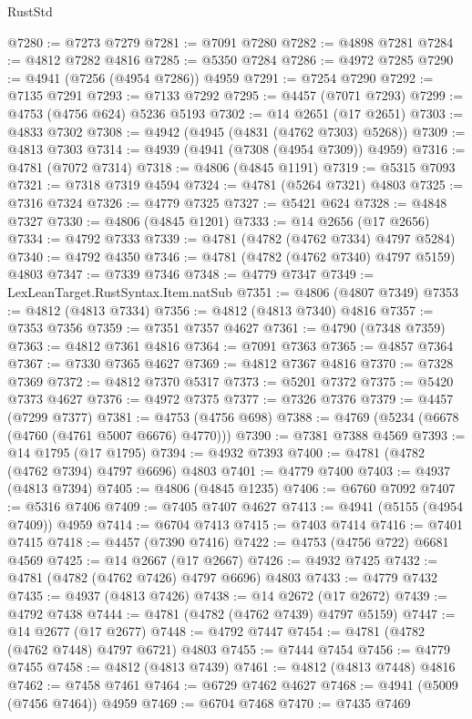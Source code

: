 \begin{lexlean}{RustStd}
\begin{coremodule}
@7280 := @7273 @7279
@7281 := @7091 @7280
@7282 := @4898 @7281
@7284 := @4812 @7282 @4816
@7285 := @5350 @7284
@7286 := @4972 @7285
@7290 := @4941 (@7256 (@4954 @7286)) @4959
@7291 := @7254 @7290
@7292 := @7135 @7291
@7293 := @7133 @7292
@7295 := @4457 (@7071 @7293)
@7299 := @4753 (@4756 @624) @5236 @5193
@7302 := @14 @2651 (@17 @2651)
@7303 := @4833 @7302
@7308 := @4942 (@4945 (@4831 (@4762 @7303) @5268))
@7309 := @4813 @7303
@7314 := @4939 (@4941 (@7308 (@4954 @7309)) @4959)
@7316 := @4781 (@7072 @7314)
@7318 := @4806 (@4845 @1191)
@7319 := @5315 @7093
@7321 := @7318 @7319 @4594
@7324 := @4781 (@5264 @7321) @4803
@7325 := @7316 @7324
@7326 := @4779 @7325
@7327 := @5421 @624
@7328 := @4848 @7327
@7330 := @4806 (@4845 @1201)
@7333 := @14 @2656 (@17 @2656)
@7334 := @4792 @7333
@7339 := @4781 (@4782 (@4762 @7334) @4797 @5284)
@7340 := @4792 @4350
@7346 := @4781 (@4782 (@4762 @7340) @4797 @5159) @4803
@7347 := @7339 @7346
@7348 := @4779 @7347
@7349 := LexLeanTarget.RustSyntax.Item.natSub
@7351 := @4806 (@4807 @7349)
@7353 := @4812 (@4813 @7334)
@7356 := @4812 (@4813 @7340) @4816
@7357 := @7353 @7356
@7359 := @7351 @7357 @4627
@7361 := @4790 (@7348 @7359)
@7363 := @4812 @7361 @4816
@7364 := @7091 @7363
@7365 := @4857 @7364
@7367 := @7330 @7365 @4627
@7369 := @4812 @7367 @4816
@7370 := @7328 @7369
@7372 := @4812 @7370 @5317
@7373 := @5201 @7372
@7375 := @5420 @7373 @4627
@7376 := @4972 @7375
@7377 := @7326 @7376
@7379 := @4457 (@7299 @7377)
@7381 := @4753 (@4756 @698)
@7388 := @4769 (@5234 (@6678 (@4760 (@4761 @5007 @6676) @4770)))
@7390 := @7381 @7388 @4569
@7393 := @14 @1795 (@17 @1795)
@7394 := @4932 @7393
@7400 := @4781 (@4782 (@4762 @7394) @4797 @6696) @4803
@7401 := @4779 @7400
@7403 := @4937 (@4813 @7394)
@7405 := @4806 (@4845 @1235)
@7406 := @6760 @7092
@7407 := @5316 @7406
@7409 := @7405 @7407 @4627
@7413 := @4941 (@5155 (@4954 @7409)) @4959
@7414 := @6704 @7413
@7415 := @7403 @7414
@7416 := @7401 @7415
@7418 := @4457 (@7390 @7416)
@7422 := @4753 (@4756 @722) @6681 @4569
@7425 := @14 @2667 (@17 @2667)
@7426 := @4932 @7425
@7432 := @4781 (@4782 (@4762 @7426) @4797 @6696) @4803
@7433 := @4779 @7432
@7435 := @4937 (@4813 @7426)
@7438 := @14 @2672 (@17 @2672)
@7439 := @4792 @7438
@7444 := @4781 (@4782 (@4762 @7439) @4797 @5159)
@7447 := @14 @2677 (@17 @2677)
@7448 := @4792 @7447
@7454 := @4781 (@4782 (@4762 @7448) @4797 @6721) @4803
@7455 := @7444 @7454
@7456 := @4779 @7455
@7458 := @4812 (@4813 @7439)
@7461 := @4812 (@4813 @7448) @4816
@7462 := @7458 @7461
@7464 := @6729 @7462 @4627
@7468 := @4941 (@5009 (@7456 @7464)) @4959
@7469 := @6704 @7468
@7470 := @7435 @7469

\end{coremodule}
\end{lexlean}
